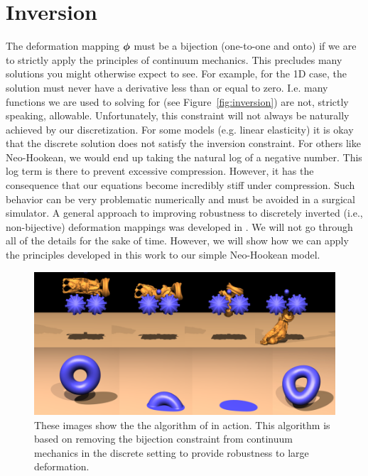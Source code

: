 \section{Inversion}

The deformation mapping $\boldsymbol{\phi}$ must be a bijection (one-to-one and onto) if we are to strictly apply the principles of continuum mechanics. This precludes many solutions you might otherwise expect to see. For example, for the 1D case, the solution must never have a derivative less than or equal to zero. I.e. many functions we are used to solving for (see Figure~\ref{fig:inversion}) are not, strictly speaking, allowable. Unfortunately, this constraint will not always be naturally achieved by our discretization. For some models (e.g. linear elasticity) it is okay that the discrete solution does not satisfy the inversion constraint. For others like Neo-Hookean, we would end up taking the natural log of a negative number. This log term is there to prevent excessive compression. However, it has the consequence that our equations become incredibly stiff under compression. Such behavior can be very problematic numerically and must be avoided in a surgical simulator. A general approach to improving robustness to discretely inverted (i.e., non-bijective) deformation mappings was developed in \cite{Irving06}. We will not go through all of the details for the sake of time. However, we will show how we can apply the principles developed in this work to our simple Neo-Hookean model.

\begin{figure}
\includegraphics[width=\columnwidth]{images/buddha_gears}
\caption{These images show the the algorithm of \cite{Irving06} in action. This algorithm is based on removing the bijection constraint from continuum mechanics in the discrete setting to provide robustness to large deformation.}
\end{figure}


